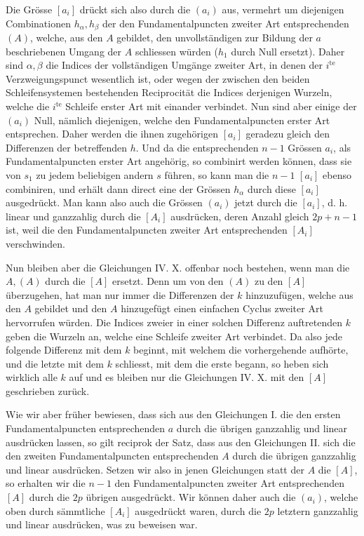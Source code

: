 \documentclass[10pt]{article}
\begin{document}
Die Grösse \([a_i]\) drückt sich also durch die \((a_i)\) aus, vermehrt um diejenigen Combinationen \(h_{\alpha},h_{\beta}\) der den Fundamentalpuncten zweiter Art entsprechenden \((A)\), welche, aus den \(A\) gebildet, den unvollständigen zur Bildung der \(a\) beschriebenen Umgang der \(A\) schliessen würden (\(h_1\) durch Null ersetzt). Daher sind \(\alpha,\beta\) die Indices der vollständigen Umgänge zweiter Art, in denen der \(i^{\text{te}}\) Verzweigungspunct wesentlich ist, oder wegen der zwischen den beiden Schleifensystemen bestehenden Reciprocität die Indices derjenigen Wurzeln, welche die \(i^{\text{te}}\) Schleife erster Art mit einander verbindet. Nun sind aber einige der \((a_i)\) Null, nämlich diejenigen, welche den Fundamentalpuncten erster Art entsprechen. Daher werden die ihnen zugehörigen \([a_i]\) geradezu gleich den Differenzen der betreffenden \(h\). Und da die entsprechenden \(n-1\) Grössen \(a_i\), als Fundamentalpuncten erster Art angehörig, so combinirt werden können, dass sie von \(s_1\) zu jedem beliebigen andern \(s\) führen, so kann man die \(n-1\) \([a_i]\) ebenso combiniren, und erhält dann direct eine der Grössen \(h_{\alpha}\) durch diese \([a_i]\) ausgedrückt. Man kann also auch die Grössen \((a_i)\) jetzt durch die \([a_i]\), d. h. linear und ganzzahlig durch die \([A_i]\) ausdrücken, deren Anzahl gleich \(2p+n-1\) ist, weil die den Fundamentalpuncten zweiter Art entsprechenden \([A_i]\) verschwinden.

Nun bleiben aber die Gleichungen IV. X. offenbar noch bestehen, wenn man die \(A,(A)\) durch die \([A]\) ersetzt. Denn um von den \((A)\) zu den \([A]\) überzugehen, hat man nur immer die Differenzen der \(k\) hinzuzufügen, welche aus den \(A\) gebildet und den \(A\) hinzugefügt einen einfachen Cyclus zweiter Art hervorrufen würden. Die Indices zweier in einer solchen Differenz auftretenden \(k\) geben die Wurzeln an, welche eine Schleife zweiter Art verbindet. Da also jede folgende Differenz mit dem \(k\) beginnt, mit welchem die vorhergehende aufhörte, und die letzte mit dem \(k\) schliesst, mit dem die erste begann, so heben sich wirklich alle \(k\) auf und es bleiben nur die Gleichungen IV. X. mit den \([A]\) geschrieben zurück.

Wie wir aber früher bewiesen, dass sich aus den Gleichungen I. die den ersten Fundamentalpuncten entsprechenden \(a\) durch die übrigen ganzzahlig und linear ausdrücken lassen, so gilt reciprok der Satz, dass aus den Gleichungen II. sich die den zweiten Fundamentalpuncten entsprechenden \(A\) durch die übrigen ganzzahlig und linear ausdrücken. Setzen wir also in jenen Gleichungen statt der \(A\) die \([A]\), so erhalten wir die \(n-1\) den Fundamentalpuncten zweiter Art entsprechenden \([A]\) durch die \(2p\) übrigen ausgedrückt. Wir können daher auch die \((a_i)\), welche oben durch sämmtliche \([A_i]\) ausgedrückt waren, durch die \(2p\) letztern ganzzahlig und linear ausdrücken, was zu beweisen war.
\end{document}
